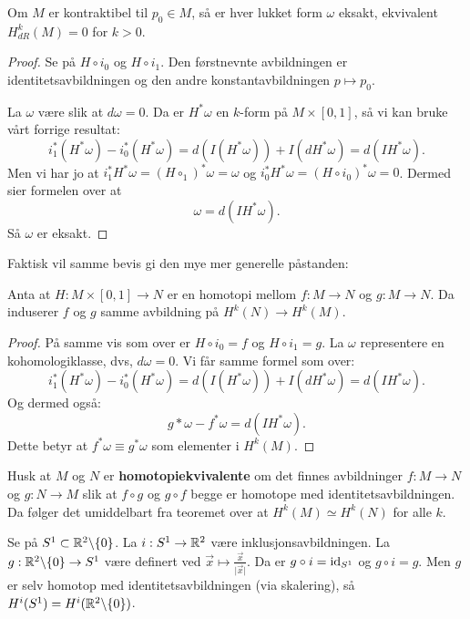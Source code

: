 \documentclass[11pt, english]{article}
\begin{document}
\begin{thm}
Om $M$ er kontraktibel til $p_0 \in M$, så er hver lukket form $\omega$ eksakt, ekvivalent $H^k_{dR}(M)=0$ for $k > 0$. 
\end{thm}
\begin{proof}
Se på $H \circ i_0$ og $H \circ i_1$. Den førstnevnte avbildningen er identitetsavbildningen og den andre konstantavbildningen $p \mapsto p_0$.

La $\omega$ være slik at $d \omega = 0$. Da er $H^\ast \omega$ en $k$-form på $M \times [0,1]$, så vi kan bruke vårt forrige resultat:
$$
i_1^\ast (H^\ast \omega) - i_0^\ast (H^\ast \omega) = d(I(H^\ast \omega))+I(d H^\ast \omega) = d(I H^\ast \omega).
$$
Men vi har jo at $i_1^\ast H^\ast \omega = (H \circ_1)^\ast \omega = \omega$ og $i_0^\ast H^\ast \omega = (H \circ i_0)^\ast \omega = 0$. Dermed sier formelen over at
$$
\omega = d(I H^\ast \omega).
$$
Så $\omega$ er eksakt.
\end{proof}

Faktisk vil samme bevis gi den mye mer generelle påstanden:
\begin{thm}
Anta at $H:M \times [0,1] \to N$ er en homotopi mellom $f:M \to N$ og $g:M \to N$. Da induserer $f$ og $g$ samme avbildning på $H^k(N) \to H^k (M)$. 
\end{thm}
\begin{proof}
På samme vis  som over er $H \circ i_0=f$ og $H \circ i_1 = g$. La $\omega$ representere en kohomologiklasse, dvs, $d \omega=0$. Vi får samme formel som over:
$$
i_1^\ast (H^\ast \omega) - i_0^\ast (H^\ast \omega) = d(I(H^\ast \omega))+I(d H^\ast \omega) = d(I H^\ast \omega).
$$
Og dermed også:
$$
g\ast \omega - f^\ast \omega = d(IH^\ast \omega).
$$
Dette betyr at $f^\ast \omega  \equiv g^\ast \omega$ som elementer i $H^k(M)$. 
\end{proof}

\begin{remark}
Husk at $M$ og $N$ er \textbf{homotopiekvivalente} om det finnes avbildninger $f:M \to N$ og $g:N \to M$ slik at $f \circ g$ og $g \circ f$ begge er homotope med identitetsavbildningen. Da følger det umiddelbart fra teoremet over at $H^k(M) \simeq H^k(N)$ for alle $k$. 
\end{remark}
\begin{example}
Se på $S^1 \subset \mathbb{R}^2 \backslash \{ 0\}$. La $i:S^1 \to \mathbb{R}^2$ være inklusjonsavbildningen. La $g:\mathbb{R}^2 \backslash \{ 0 \} \to S^1$ være definert ved $\vec x \mapsto \frac{\vec x}{\lvert \vec x \rvert}$. Da er $g \circ i = \text{id}_{S^1}$ og $g \circ i = g$. Men $g$ er selv homotop med identitetsavbildningen (via skalering), så $H^i(S^1)= H^i(\mathbb{R}^2 \backslash \{ 0 \})$. 
\end{example}
\end{document}
